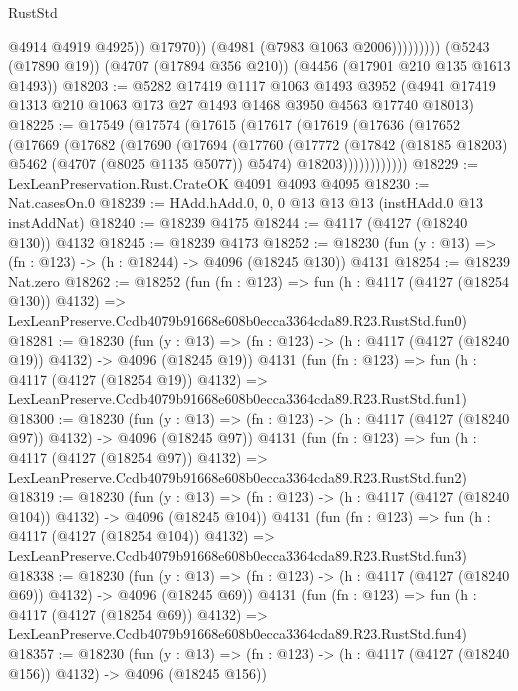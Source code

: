 \begin{lexlean}{RustStd}
\begin{coremodule}
                          @4914
                          @4919
                          @4925))
                      @17970))
                  (@4981 (@7983 @1063 @2006)))))))))
    (@5243 (@17890 @19))
    (@4707 (@17894 @356 @210))
    (@4456 (@17901 @210 @135 @1613 @1493))
@18203 := @5282
    @17419
    @1117
    @1063
    @1493
    @3952
    (@4941 @17419 @1313 @210 @1063 @173 @27 @1493 @1468 @3950 @4563 @17740 @18013)
@18225 := @17549
    (@17574
      (@17615
        (@17617
          (@17619
            (@17636
              (@17652
                (@17669
                  (@17682
                    (@17690
                      (@17694
                        (@17760
                          (@17772
                            (@17842 (@18185 @18203) @5462 (@4707 (@8025 @1135 @5077)) @5474)
                            @18203))))))))))))
@18229 := LexLeanPreservation.Rust.CrateOK @4091 @4093 @4095
@18230 := Nat.casesOn.{0}
@18239 := HAdd.hAdd.{0, 0, 0} @13 @13 @13 (instHAdd.{0} @13 instAddNat)
@18240 := @18239 @4175
@18244 := @4117 (@4127 (@18240 @130)) @4132
@18245 := @18239 @4173
@18252 := @18230 (fun (y : @13) => (fn : @123) -> (h : @18244) -> @4096 (@18245 @130)) @4131
@18254 := @18239 Nat.zero
@18262 := @18252
    (fun (fn : @123) =>
    fun (h : @4117 (@4127 (@18254 @130)) @4132) =>
    LexLeanPreserve.Ccdb4079b91668e608b0ecca3364cda89.R23.RustStd.fun0)
@18281 := @18230
    (fun (y : @13) => (fn : @123) -> (h : @4117 (@4127 (@18240 @19)) @4132) -> @4096 (@18245 @19))
    @4131
    (fun (fn : @123) =>
    fun (h : @4117 (@4127 (@18254 @19)) @4132) =>
    LexLeanPreserve.Ccdb4079b91668e608b0ecca3364cda89.R23.RustStd.fun1)
@18300 := @18230
    (fun (y : @13) => (fn : @123) -> (h : @4117 (@4127 (@18240 @97)) @4132) -> @4096 (@18245 @97))
    @4131
    (fun (fn : @123) =>
    fun (h : @4117 (@4127 (@18254 @97)) @4132) =>
    LexLeanPreserve.Ccdb4079b91668e608b0ecca3364cda89.R23.RustStd.fun2)
@18319 := @18230
    (fun (y : @13) => (fn : @123) -> (h : @4117 (@4127 (@18240 @104)) @4132) -> @4096 (@18245 @104))
    @4131
    (fun (fn : @123) =>
    fun (h : @4117 (@4127 (@18254 @104)) @4132) =>
    LexLeanPreserve.Ccdb4079b91668e608b0ecca3364cda89.R23.RustStd.fun3)
@18338 := @18230
    (fun (y : @13) => (fn : @123) -> (h : @4117 (@4127 (@18240 @69)) @4132) -> @4096 (@18245 @69))
    @4131
    (fun (fn : @123) =>
    fun (h : @4117 (@4127 (@18254 @69)) @4132) =>
    LexLeanPreserve.Ccdb4079b91668e608b0ecca3364cda89.R23.RustStd.fun4)
@18357 := @18230
    (fun (y : @13) => (fn : @123) -> (h : @4117 (@4127 (@18240 @156)) @4132) -> @4096 (@18245 @156))

\end{coremodule}
\end{lexlean}
